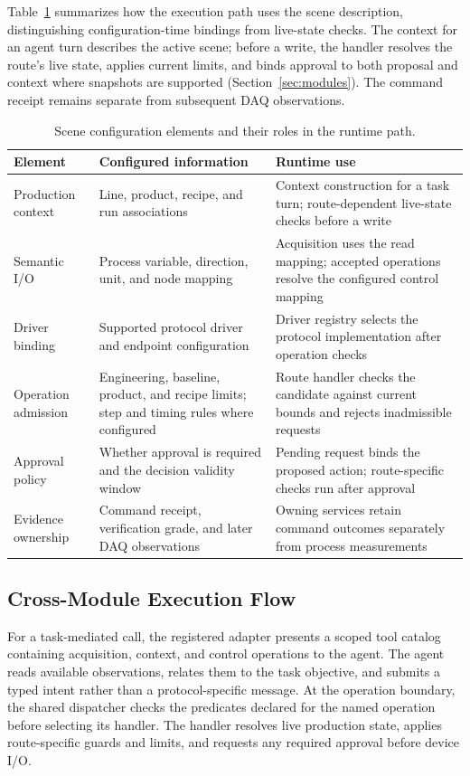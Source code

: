 Table~\ref{tab:scene-config} summarizes how the execution path uses the scene description, distinguishing configuration-time bindings from live-state checks. The context for an agent turn describes the active scene; before a write, the handler resolves the route's live state, applies current limits, and binds approval to both proposal and context where snapshots are supported (Section~\ref{sec:modules}). The command receipt remains separate from subsequent DAQ observations.

\begin{table}[!t]
\centering
\caption{Scene configuration elements and their roles in the runtime path.}
\label{tab:scene-config}
\footnotesize
\setlength{\tabcolsep}{5pt}
\begin{tabularx}{\textwidth}{@{}>{\raggedright\arraybackslash}p{}>{\raggedright\arraybackslash}p{}X@{}}
\toprule
Element & Configured information & Runtime use\\
\midrule
Production context & Line, product, recipe, and run associations & Context construction for a task turn; route-dependent live-state checks before a write\\
Semantic I/O & Process variable, direction, unit, and node mapping & Acquisition uses the read mapping; accepted operations resolve the configured control mapping\\
Driver binding & Supported protocol driver and endpoint configuration & Driver registry selects the protocol implementation after operation checks\\
Operation admission & Engineering, baseline, product, and recipe limits; step and timing rules where configured & Route handler checks the candidate against current bounds and rejects inadmissible requests\\
Approval policy & Whether approval is required and the decision validity window & Pending request binds the proposed action; route-specific checks run after approval\\
Evidence ownership & Command receipt, verification grade, and later DAQ observations & Owning services retain command outcomes separately from process measurements\\
\bottomrule
\end{tabularx}
\end{table}

\subsection{Cross-Module Execution Flow}
\label{sec:executionflow}
For a task-mediated call, the registered adapter presents a scoped tool
catalog containing acquisition, context, and control operations to the agent.
The agent reads available observations, relates them to the task objective, and
submits a typed intent rather than a protocol-specific message. At the
operation boundary, the shared dispatcher checks the predicates declared for
the named operation before selecting its handler. The handler resolves live
production state, applies route-specific guards and limits, and requests any
required approval before device I/O.


